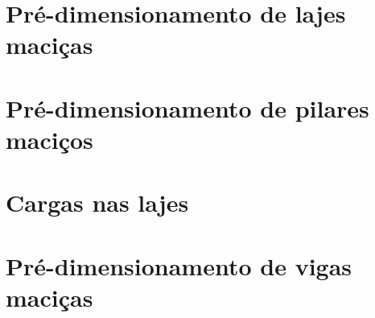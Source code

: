 \documentclass[12pt, a4paper]{article}
\begin{document}
	

	\section{Pré-dimensionamento de lajes maciças}
	

	\section{Pré-dimensionamento de pilares maciços}
	

	\section{Cargas nas lajes}
	

	\section{Pré-dimensionamento de vigas maciças}
	
\end{document}
